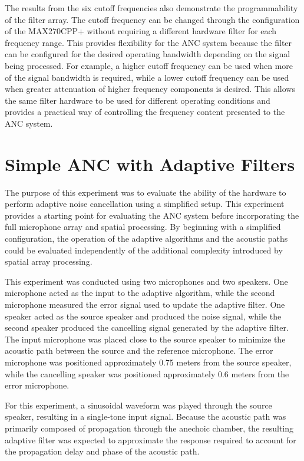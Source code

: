 The results from the six cutoff frequencies also demonstrate the programmability of the filter array. The cutoff frequency can be changed through the configuration of the MAX270CPP+ without requiring a different hardware filter for each frequency range. This provides flexibility for the ANC system because the filter can be configured for the desired operating bandwidth depending on the signal being processed. For example, a higher cutoff frequency can be used when more of the signal bandwidth is required, while a lower cutoff frequency can be used when greater attenuation of higher frequency components is desired. This allows the same filter hardware to be used for different operating conditions and provides a practical way of controlling the frequency content presented to the ANC system.

\section{Simple ANC with Adaptive Filters}

The purpose of this experiment was to evaluate the ability of the hardware to perform adaptive noise cancellation using a simplified setup. This experiment provides a starting point for evaluating the ANC system before incorporating the full microphone array and spatial processing. By beginning with a simplified configuration, the operation of the adaptive algorithms and the acoustic paths could be evaluated independently of the additional complexity introduced by spatial array processing.

This experiment was conducted using two microphones and two speakers. One microphone acted as the input to the adaptive algorithm, while the second microphone measured the error signal used to update the adaptive filter. One speaker acted as the source speaker and produced the noise signal, while the second speaker produced the cancelling signal generated by the adaptive filter. The input microphone was placed close to the source speaker to minimize the acoustic path between the source and the reference microphone. The error microphone was positioned approximately 0.75 meters from the source speaker, while the cancelling speaker was positioned approximately 0.6 meters from the error microphone.

For this experiment, a sinusoidal waveform was played through the source speaker, resulting in a single-tone input signal. Because the acoustic path was primarily composed of propagation through the anechoic chamber, the resulting adaptive filter was expected to approximate the response required to account for the propagation delay and phase of the acoustic path.

